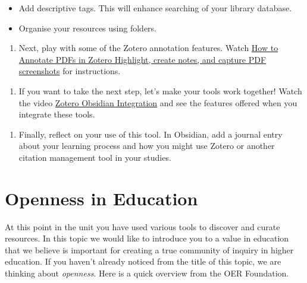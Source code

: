 \documentclass[
]{book}
\providecommand{\tightlist}{%
  \setlength{\itemsep}{0pt}\setlength{\parskip}{0pt}}
\theoremstyle{definition}
\theoremstyle{definition}
\theoremstyle{definition}
\theoremstyle{definition}
\theoremstyle{remark}
\begin{document}
\begin{reflect}
\begin{itemize}
\tightlist
\item
  Add descriptive tags. This will enhance searching of your library database.
\item
  Organise your resources using folders.
\end{itemize}

\begin{enumerate}
\def\labelenumi{\arabic{enumi}.}
\setcounter{enumi}{3}
\tightlist
\item
  Next, play with some of the Zotero annotation features. Watch \href{https://www.youtube.com/watch?v=lGeJCsNHBR4}{How to Annotate PDFs in Zotero \textbar{} Highlight, create notes, and capture PDF screenshots} for instructions.
\end{enumerate}

\begin{enumerate}
\def\labelenumi{\arabic{enumi}.}
\setcounter{enumi}{4}
\tightlist
\item
  If you want to take the next step, let's make your tools work together! Watch the video \href{https://www.youtube.com/watch?v=CGGeMrtyjBI}{Zotero Obsidian Integration} and see the features offered when you integrate these tools.
\end{enumerate}

\begin{enumerate}
\def\labelenumi{\arabic{enumi}.}
\setcounter{enumi}{5}
\tightlist
\item
  Finally, reflect on your use of this tool. In Obsidian, add a journal entry about your learning process and how you might use Zotero or another citation management tool in your studies.
\end{enumerate}
\end{reflect}

\hypertarget{openness-in-education}{%
\section{Openness in Education}\label{openness-in-education}}

At this point in the unit you have used various tools to discover and curate resources. In this topic we would like to introduce you to a value in education that we believe is important for creating a true community of inquiry in higher education. If you haven't already noticed from the title of this topic, we are thinking about \emph{openness}. Here is a quick overview from the OER Foundation.
\end{document}
